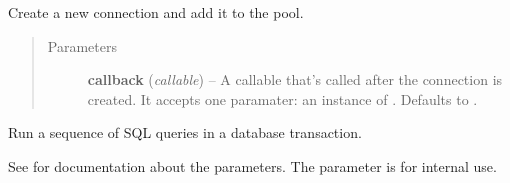 \documentclass[letterpaper,10pt,english]{sphinxmanual}
\begin{document}
\begin{fulllineitems}
\begin{fulllineitems}
\label{api:momoko.Pool.new}
Create a new connection and add it to the pool.
\begin{quote}\begin{description}
\item[{Parameters}] \leavevmode
\textbf{callback} (\emph{callable}) -- A callable that's called after the connection is created. It accepts
one paramater: an instance of {\hyperref[api:momoko.Connection]{}}. Defaults to .

\end{description}\end{quote}

\end{fulllineitems}


\begin{fulllineitems}
\label{api:momoko.Pool.transaction}
Run a sequence of SQL queries in a database transaction.

See {\hyperref[api:momoko.Connection.transaction]{}} for documentation about the
parameters. The  parameter is for internal use.

\end{fulllineitems}


\end{fulllineitems}

\end{document}

